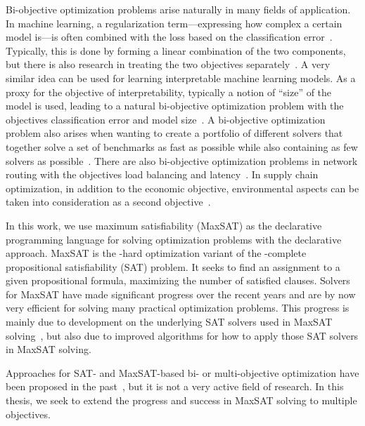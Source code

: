Bi-objective optimization problems arise naturally in many fields of application.
In machine learning, a regularization term---expressing how complex a certain model is---is often combined with the loss based on the classification error~\autocite{}.
Typically, this is done by forming a linear combination of the two components, but there is also research in treating the two objectives separately~\autocite{DBLP:journals/tsmc/JinS08}.
A very similar idea can be used for learning interpretable machine learning models.
As a proxy for the objective of interpretability, typically a notion of ``size'' of the model is used, leading to a natural bi-objective optimization problem with the objectives classification error and model size~\autocites{DBLP:conf/ijcai/Ignatiev0NS21,DBLP:conf/cp/MaliotovM18,DBLP:conf/ijcai/NarodytskaIPM18,DBLP:conf/ijcai/Hu0HH20,DBLP:conf/cp/YuISB20,DBLP:conf/aaai/Ignatiev0S021}.
A bi-objective optimization problem also arises when wanting to create a portfolio of different solvers that together solve a set of benchmarks as fast as possible while also containing as few solvers as possible~\autocite{DBLP:conf/cp/JanotaMSM21}.
There are also bi-objective optimization problems in network routing with the objectives load balancing and latency~\autocite{SilverioEtAl2022biobjectiveoptimization}.
In supply chain optimization, in addition to the economic objective, environmental aspects can be taken into consideration as a second objective~\autocite{DBLP:journals/cce/Pinto-VarelaBN11}.

In this work, we use maximum satisfiability (MaxSAT) as the declarative programming language for solving optimization problems with the declarative approach.
MaxSAT is the \NP-hard optimization variant of the \NP-complete propositional satisfiability (SAT) problem.
It seeks to find an assignment to a given propositional formula, maximizing the number of satisfied clauses.
Solvers for MaxSAT have made significant progress over the recent years and are by now very efficient for solving many practical optimization problems.
This progress is mainly due to development on the underlying SAT solvers used in MaxSAT solving~\autocite{}, but also due to improved algorithms for how to apply those SAT solvers in MaxSAT solving.

Approaches for SAT- and MaxSAT-based bi- or multi-objective optimization have been proposed in the past~\autocites{DBLP:conf/cp/SohBTB17,DBLP:conf/ijcai/Terra-NevesLM18a,DBLP:conf/aaai/Terra-NevesLM18,DBLP:conf/ijcai/Terra-NevesLM18,DBLP:conf/cp/JanotaMSM21}, but it is not a very active field of research.
In this thesis, we seek to extend the progress and success in MaxSAT solving to multiple objectives.

